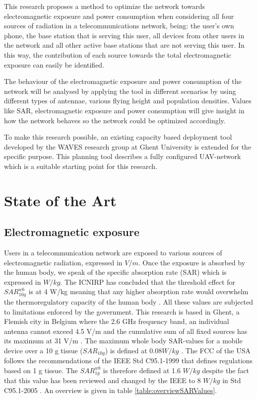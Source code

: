 \documentclass[twocolumn]{phdsymp} %
\begin{document}
This research proposes a method to optimize the network towards electromagnetic exposure and power consumption
when considering all four sources of radiation in a telecommunications network, being: the user's own phone,
 the base station that is serving this user, 
all devices from other users in the network and all 
other active base stations that are not serving this user. In this way, the contribution of each source towards the total 
electromagnetic exposure can easily be identified. 

The behaviour of the electromagnetic exposure and power consumption of the network will be analysed
 by applying the tool in different scenarios by using different types of antennae, various flying height and population 
densities.
Values like \gls{SAR}, electromagnetic exposure and power consumption will 
 give insight in how the network behaves so the network could be optimized accordingly.

To make this research possible, 
an existing capacity based deployment tool developed by the WAVES research group at Ghent University is extended for the specific purpose.
This planning tool describes a fully configured \gls{UAV}-network which is a suitable starting point for this research.


\section{State of the Art}
\subsection{Electromagnetic exposure}

Users in a telecommunication network are exposed to various sources of electromagnetic radiation, expressed in $V/m$. Once the exposure is absorbed by the human 
body, we speak of the specific absorption rate (SAR) which is expressed in $W/kg$. 
The \gls{ICNIRP} has concluded that the threshold effect for $SAR^{wb}_{10g}$ is at 4 W/kg meaning that any higher absorption 
rate would overwhelm the \gls{thermoregulatory capacity} of the human body  \cite{J23,J24}.
All these values are 
subjected to limitations enforced by the government. This research is based in Ghent, 
a Flemish city in Belgium where the 2.6 GHz frequency band, an individual antenna cannot exceed 4.5 V/m and the cumulative sum of all 
fixed sources has its maximum at 31 V/m \cite{J23,S13_normenBelgie}. The maximum whole body SAR-values for a mobile device 
over a 10 g tissue ($SAR_{10g}$) is defined at $0.08 W/kg$ \cite{J30,J23,S20}. 
The \gls{FCC} of the \gls{USA} follows the recommendations of the \gls{IEEE} Std C95.1-1999 \cite{P1,P2} that defines 
regulations based on 1 g tissue.
The $SAR^{wb}_{1g}$ is therefore defined at 1.6 $W/kg$ despite the fact that this value has been reviewed and changed by the \gls{IEEE} to 8 $W/kg$ in Std C95.1-2005 \cite{P2}.
An overview is given in table \ref{table:overviewSARValues}.
\end{document}
